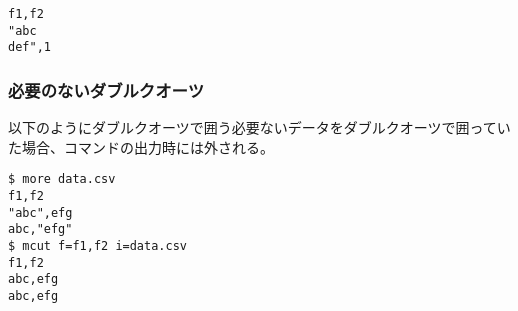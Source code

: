 \begin{Verbatim}[baselinestretch=0.7,frame=single]
f1,f2
"abc
def",1
\end{Verbatim}

\subsubsection{必要のないダブルクオーツ}

以下のようにダブルクオーツで囲う必要ないデータをダブルクオーツで囲っていた場合、コマンドの出力時には外される。

\begin{Verbatim}[baselinestretch=0.7,frame=single]
$ more data.csv
f1,f2
"abc",efg
abc,"efg"
$ mcut f=f1,f2 i=data.csv
f1,f2
abc,efg
abc,efg
\end{Verbatim}

%

